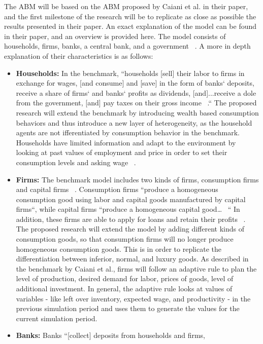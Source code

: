 \documentclass[11pt]{article}
\begin{document}
The ABM will be based on the ABM proposed by Caiani et al. in their paper, and
the first milestone of the research will be to replicate as close as possible the
results presented in their paper. An exact explanation of the model can be found
in their paper, and an overview is provided here. The model consists of households,
firms, banks, a central bank, and a government  ~\cite{Caiani-benchmark-paper}.
A more in depth explanation of their characteristics is as follows:
\begin{itemize}
  \item \textbf{Households:} In the benchmark, ``households [sell] their labor
  to firms in exchange for wages, [and consume] and [save] in the form of banks`
  deposits, receive a share of firms` and banks` profits as dividends,
  [and]...receive a dole from the government, [and] pay taxes on their gross
  income  ~\cite{Caiani-benchmark-paper}.`` The proposed research will extend
  the benchmark by introducing wealth based consumption behaviors and thus
  introduce a new layer of heterogeneity, as the household agents are not
  ifferentiated by consumption behavior in the benchmark. Households have limited
  information and adapt to the environment by looking at past values of employment
  and price in order to set their consumption levels and asking wage  ~\cite{Caiani-benchmark-paper}.
  \item \textbf{Firms:} The benchmark model includes two kinds of firms, consumption
  firms and capital firms  ~\cite{Caiani-benchmark-paper}. Consumption firms
  ``produce a homogeneous consumption good using labor and capital goods manufactured
  by capital firms``, while capital firms ``produce a homogeneous capital good… ~\cite{Caiani-benchmark-paper}``
  In addition, these firms are able to apply for loans and retain their profits  ~\cite{Caiani-benchmark-paper}.
   The proposed research will extend the model by adding different kinds of
   consumption goods, so that consumption firms will no longer produce homogeneous
   consumption goods. This is in order to replicate the differentiation between
   inferior, normal, and luxury goods. As described in the benchmark by Caiani et al.,
   firms will follow an adaptive rule to plan the level of production, desired
   demand for labor, prices of goods, level of additional investment. In general,
   the adaptive rule looks at values of variables - like left over inventory,
   expected wage, and productivity - in the previous simulation period and uses
   them to generate the values for the current simulation period.
 \item \textbf{Banks:} Banks ``[collect] deposits from households and firms,

\end{itemize}
\end{document}
